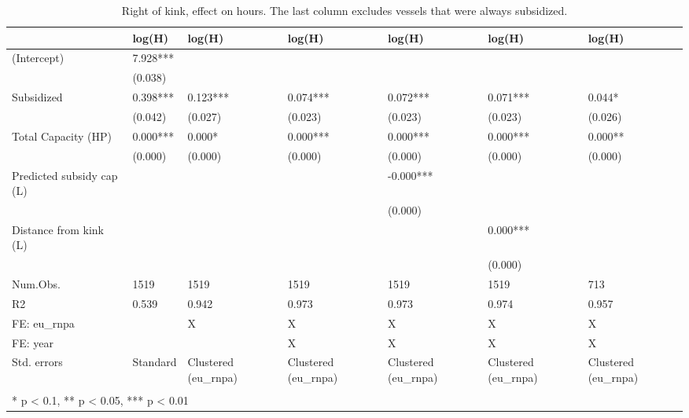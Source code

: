 \begin{table}

\caption{\label{tab:}Right of kink, effect on hours. The last column excludes vessels that were always subsidized.}
\centering
\begin{tabular}[t]{lllllll}
\toprule
  & log(H) & log(H)  & log(H)   & log(H)    & log(H)     & log(H)     \\
\midrule
(Intercept) & 7.928*** &  &  &  &  & \\
 & (0.038) &  &  &  &  & \\
Subsidized & 0.398*** & 0.123*** & 0.074*** & 0.072*** & 0.071*** & 0.044*\\
 & (0.042) & (0.027) & (0.023) & (0.023) & (0.023) & (0.026)\\
Total Capacity (HP) & 0.000*** & 0.000* & 0.000*** & 0.000*** & 0.000*** & 0.000**\\
 & (0.000) & (0.000) & (0.000) & (0.000) & (0.000) & (0.000)\\
Predicted subsidy cap (L) &  &  &  & -0.000*** &  & \\
 &  &  &  & (0.000) &  & \\
Distance from kink (L) &  &  &  &  & 0.000*** & \\
 &  &  &  &  & (0.000) & \\
\midrule
Num.Obs. & 1519 & 1519 & 1519 & 1519 & 1519 & 713\\
R2 & 0.539 & 0.942 & 0.973 & 0.973 & 0.974 & 0.957\\
FE: eu\_rnpa &  & X & X & X & X & X\\
FE: year &  &  & X & X & X & X\\
Std. errors & Standard & Clustered (eu\_rnpa) & Clustered (eu\_rnpa) & Clustered (eu\_rnpa) & Clustered (eu\_rnpa) & Clustered (eu\_rnpa)\\
\bottomrule
\multicolumn{7}{l}{\textsuperscript{} * p < 0.1, ** p < 0.05, *** p < 0.01}\\
\end{tabular}
\end{table}
